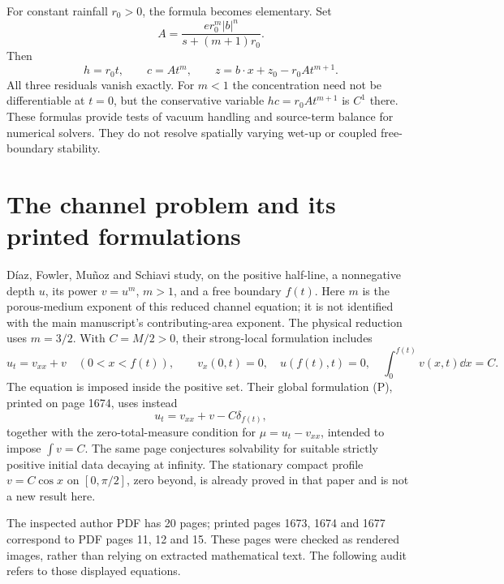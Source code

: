 \documentclass[11pt,a4paper]{article}
\theoremstyle{remark}\newtheorem{remark}[theorem]{Remark}
\begin{document}
For constant rainfall $r_0>0$, the formula becomes elementary. Set
\[
 A=\frac{e r_0^m|b|^n}{s+(m+1)r_0}.
\]
Then
\begin{equation}
 h=r_0t,\qquad c=At^m,\qquad
 z=b\cdot x+z_0-r_0A t^{m+1}.\label{eq:constantwetup}
\end{equation}
All three residuals vanish exactly. For $m<1$ the concentration need not be differentiable at $t=0$, but the conservative variable $hc=r_0A t^{m+1}$ is $C^1$ there. These formulas provide tests of vacuum handling and source-term balance for numerical solvers. They do not resolve spatially varying wet-up or coupled free-boundary stability.

\section{The channel problem and its printed formulations}
D\'iaz, Fowler, Mu\~noz and Schiavi \cite{Diaz} study, on the positive half-line, a nonnegative depth $u$, its power $v=u^m$, $m>1$, and a free boundary $f(t)$. Here $m$ is the porous-medium exponent of this reduced channel equation; it is not identified with the main manuscript's contributing-area exponent. The physical reduction uses $m=3/2$. With $C=M/2>0$, their strong-local formulation includes
\begin{equation}
 u_t=v_{xx}+v\quad(0<x<f(t)),\qquad
 v_x(0,t)=0,\quad u(f(t),t)=0,\quad
 \int_0^{f(t)}v(x,t)\dd x=C.\label{eq:SL}
\end{equation}
The equation is imposed inside the positive set. Their global formulation (P), printed on page 1674, uses instead
\begin{equation}
 u_t=v_{xx}+v-C\delta_{f(t)},\label{eq:P}
\end{equation}
together with the zero-total-measure condition for $\mu=u_t-v_{xx}$, intended to impose $\int v=C$. The same page conjectures solvability for suitable strictly positive initial data decaying at infinity. The stationary compact profile $v=C\cos x$ on $[0,\pi/2]$, zero beyond, is already proved in that paper and is not a new result here.

The inspected author PDF has 20 pages; printed pages 1673, 1674 and 1677 correspond to PDF pages 11, 12 and 15. These pages were checked as rendered images, rather than relying on extracted mathematical text. The following audit refers to those displayed equations.
\end{document}
